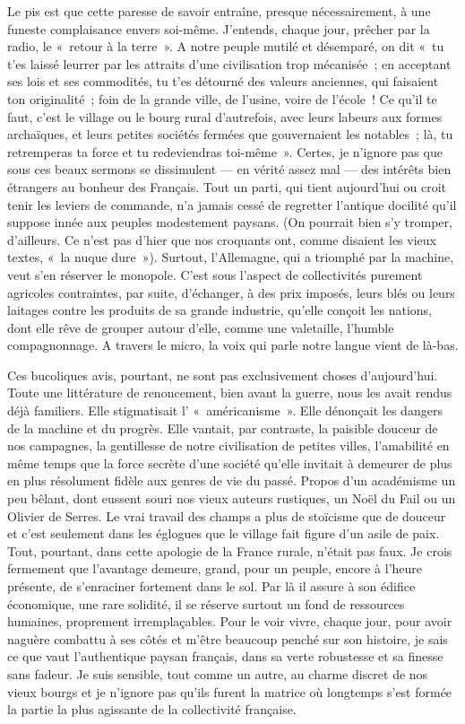 \documentclass[french,twoside]{book} %
\begin{document}
Le pis est que cette paresse de savoir entraîne, presque nécessairement, à une funeste complaisance envers soi-même. J’entends, chaque jour, prêcher par la radio, le « retour à la terre ». A notre peuple mutilé et désemparé, on dit « tu t’es laissé leurrer par les attraits d’une civilisation trop mécanisée ; en acceptant ses lois et ses commodités, tu t’es détourné des valeurs anciennes, qui faisaient ton originalité ; foin de la grande ville, de l’usine, voire de l’école ! Ce qu’il te faut, c’est le village ou le bourg rural d’autrefois, avec leurs labeurs aux formes archaïques, et leurs petites sociétés fermées que gouvernaient les notables ; là, tu retremperas ta force et tu redeviendras toi-même ». Certes, je n’ignore pas que sous ces beaux sermons se dissimulent — en vérité assez mal — des intérêts bien étrangers au bonheur des Français. Tout un parti, qui tient aujourd’hui ou croit tenir les leviers de commande, n’a jamais cessé de regretter l’antique docilité qu’il   suppose innée aux peuples modestement paysans. (On pourrait bien s’y tromper, d’ailleurs. Ce n’est pas d’hier que nos croquants ont, comme disaient les vieux textes, « la nuque dure »). Surtout, l’Allemagne, qui a triomphé par la machine, veut s’en réserver le monopole. C’est sous l’aspect de collectivités purement agricoles contraintes, par suite, d’échanger, à des prix imposés, leurs blés ou leurs laitages contre les produits de sa grande industrie, qu’elle conçoit les nations, dont elle rêve de grouper autour d’elle, comme une valetaille, l’humble compagnonnage. A travers le micro, la voix qui parle notre langue vient de là-bas.\par
Ces bucoliques avis, pourtant, ne sont pas exclusivement choses d’aujourd’hui. Toute une littérature de renoncement, bien avant la guerre, nous les avait rendus déjà familiers. Elle stigmatisait l’ « américanisme ». Elle dénonçait les dangers de la machine et du progrès. Elle vantait, par contraste, la paisible douceur de nos campagnes, la gentillesse de notre civilisation de petites villes, l’amabilité en même temps que la force secrète d’une société qu’elle invitait à demeurer de plus en plus résolument fidèle aux genres de vie du passé. Propos d’un académisme un peu bêlant, dont eussent souri nos vieux auteurs rustiques, un Noël du Fail ou un Olivier de Serres. Le vrai travail des champs a plus de stoïcisme que de douceur et c’est seulement dans les églogues que le village fait figure d’un asile de paix. Tout, pourtant, dans cette apologie de la France rurale, n’était pas faux. Je crois fermement que l’avantage demeure, grand, pour un peuple, encore à l’heure présente, de s’enraciner fortement dans le sol. Par là il assure à son édifice économique, une rare solidité, il se réserve surtout un fond de ressources humaines, proprement irremplaçables. Pour le voir vivre, chaque jour, pour avoir naguère combattu à ses côtés et m’être beaucoup penché sur son histoire, je sais ce   que vaut l’authentique paysan français, dans sa verte robustesse et sa finesse sans fadeur. Je suis sensible, tout comme un autre, au charme discret de nos vieux bourgs et je n’ignore pas qu’ils furent la matrice où longtemps s’est formée la partie la plus agissante de la collectivité française.\par
\end{document}
